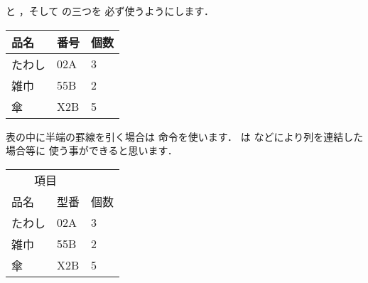 \begin{usage}
\toprule    %
\midrule    %
\bottomrule %
\end{usage}



 と ，そして  の三つを
必ず使うようにします．
\begin{inout}
\usepackage{booktabs}
\begin{tabular}{lll}
 \toprule
 品名 & 番号 & 個数 \\ \midrule
 たわし & 02A & 3 \\
 雑巾   & 55B & 2 \\
 傘     & X2B & 5 \\ \bottomrule
\end{tabular}
\end{inout}
表の中に半端の罫線を引く場合は  命令を使います．
 は  などにより列を連結した場合等に
使う事ができると思います．
\begin{inout}
\usepackage{booktabs}
\begin{tabular}{lll}
 \toprule
 \multicolumn{2}{c}{項目} & \\
 \cmidrule{1-2}
 品名 & 型番 & 個数\\ \midrule
 たわし & 02A & 3 \\
 雑巾   & 55B & 2 \\
 傘     & X2B & 5 \\ \bottomrule
\end{tabular}
\end{inout}

